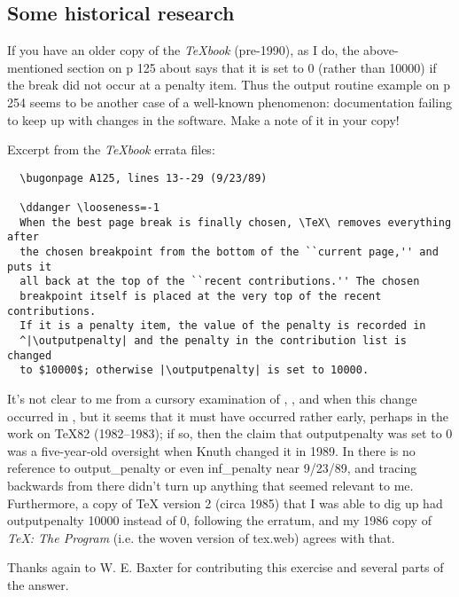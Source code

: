 \subsection{Some historical research}

If you have an older copy of the \emph{TeXbook} (pre-1990), as I do, the
above-mentioned section on p 125 about \cmd{\outputpenalty} says that it is
set to 0 (rather than 10000) if the break did not occur at a penalty
item. Thus the output routine example on p 254 seems to be another
case of a well-known phenomenon: documentation failing to keep up with
changes in the software. Make a note of it in your copy!

Excerpt from the \emph{TeXbook} errata files:
\begin{verbatim}
  \bugonpage A125, lines 13--29 (9/23/89)

  \ddanger \looseness=-1
  When the best page break is finally chosen, \TeX\ removes everything after
  the chosen breakpoint from the bottom of the ``current page,'' and puts it
  all back at the top of the ``recent contributions.'' The chosen
  breakpoint itself is placed at the very top of the recent contributions.
  If it is a penalty item, the value of the penalty is recorded in
  ^|\outputpenalty| and the penalty in the contribution list is changed
  to $10000$; otherwise |\outputpenalty| is set to 10000.
\end{verbatim}

It's not clear to me from a cursory examination of ,
, and  when this change occurred 
in , but it
seems that it must have occurred rather early, perhaps in the work on
TeX82 (1982--1983); if so, then the claim that outputpenalty was set to
0 was a five-year-old oversight when Knuth changed it in 1989. In
 there is no reference to output\_penalty or even inf\_penalty
near 9/23/89, and tracing backwards from there didn't turn up anything
that seemed relevant to me. Furthermore, a copy of TeX version 2 (circa
1985) that I was able to dig up had outputpenalty 10000 instead of 0,
following the erratum, and my 1986 copy of \emph{TeX: The Program} (i.e.
the woven version of tex.web) agrees with that.

Thanks again to W. E. Baxter for contributing 
this exercise and several parts of the answer.




